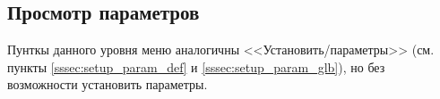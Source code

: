 \subsection{Просмотр параметров}

Пунткы данного уровня меню  аналогичны <<Установить/параметры>> (см. пункты \ref{sssec:setup_param_def} и \ref{sssec:setup_param_glb}), но без возможности установить параметры.
